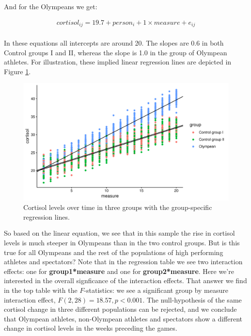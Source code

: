 \documentclass[]{book}\usepackage[]{graphicx}\usepackage[]{color}
\makeatletter
\def\maxwidth{ %
  \ifdim\Gin@nat@width>\linewidth
    \linewidth
  \else
    \Gin@nat@width
  \fi
}
\newenvironment{knitrout}{}{} %
\makeatother
\begin{document}
And for the Olympeans we get:

\begin{eqnarray}
cortisol_{ij} = 19.7 + person_i + 1 \times measure  +   e_{ij} \nonumber \\
\end{eqnarray}


In these equations all intercepts are around 20. The slopes are 0.6 in both Control groups I and II, whereas the slope is 1.0 in the group of Olympean athletes. For illustration, these implied linear regression lines are depicted in Figure \ref{fig:analysismixed20_3}. 


\begin{knitrout}
\color{fgcolor}\begin{figure}

{\centering \includegraphics[width=\maxwidth]{figure/analysismixed20_3-1} 

}

\caption[Cortisol levels over time in three groups with the group-specific regression lines]{Cortisol levels over time in three groups with the group-specific regression lines.}\label{fig:analysismixed20_3}
\end{figure}


\end{knitrout}

So based on the linear equation, we see that in this sample the rise in cortisol levels is much steeper in Olympeans than in the two control groups. But is this true for all Olympeans and the rest of the populations of high performing athletes and spectators? Note that in the regression table we see two interaction effects: one for \textbf{group1*measure} and one for \textbf{group2*measure}. Here we're interested in the overall signficance of the interaction effects. That answer we find in the top table with the $F$-statistics: we see a significant group by measure interaction effect, $F(2, 28)= 18.57, p<0.001$. The null-hypothesis of the same cortisol change in three different populations can be rejected, and we conclude that Olympean athletes, non-Olympean athletes and spectators show a different change in cortisol levels in the weeks preceding the games.  
\end{document}
